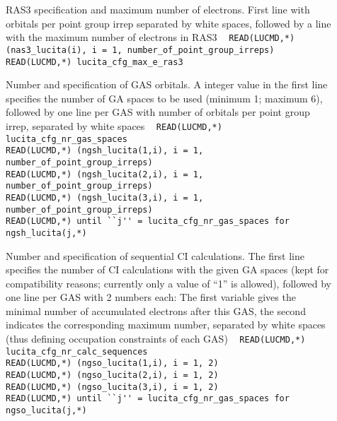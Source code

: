 \begin{description}
\item[] RAS3 specification and maximum number of electrons. 
First line with orbitals per point group irrep separated by white spaces, 
followed by a line with the maximum number of electrons in RAS3 \verb| |\newline
\verb|READ(LUCMD,*) (nas3_lucita(i), i = 1, number_of_point_group_irreps) |\\
\verb|READ(LUCMD,*) lucita_cfg_max_e_ras3 |

\newpage
{}

\item[] Number and specification of GAS orbitals. 
A integer value in the first line specifies the number of GA spaces to be used (minimum 1; maximum 6), 
followed by one line per GAS with number of orbitals per point group irrep, separated by white spaces \verb| |\newline
\verb|READ(LUCMD,*) lucita_cfg_nr_gas_spaces |\\
\verb|READ(LUCMD,*) (ngsh_lucita(1,i), i = 1, number_of_point_group_irreps) |\\
\verb|READ(LUCMD,*) (ngsh_lucita(2,i), i = 1, number_of_point_group_irreps) |\\
\verb|READ(LUCMD,*) (ngsh_lucita(3,i), i = 1, number_of_point_group_irreps) |\\
\verb|READ(LUCMD,*) until ``j'' = lucita_cfg_nr_gas_spaces for ngsh_lucita(j,*) |

\item[] Number and specification of sequential CI calculations. The first line specifies 
the number of CI calculations with the given GA spaces (kept for compatibility reasons; 
currently only a value of ``1'' is allowed), followed by one line per GAS with 2 numbers each: 
The first variable gives the minimal number of accumulated electrons after this GAS, 
the second indicates the corresponding maximum number, 
separated by white spaces (thus defining occupation constraints of each GAS) \verb| |\newline
\verb|READ(LUCMD,*) lucita_cfg_nr_calc_sequences |\\
\verb|READ(LUCMD,*) (ngso_lucita(1,i), i = 1, 2) |\\
\verb|READ(LUCMD,*) (ngso_lucita(2,i), i = 1, 2) |\\
\verb|READ(LUCMD,*) (ngso_lucita(3,i), i = 1, 2) |\\
\verb|READ(LUCMD,*) until ``j'' = lucita_cfg_nr_gas_spaces for ngso_lucita(j,*) |

\end{description}
